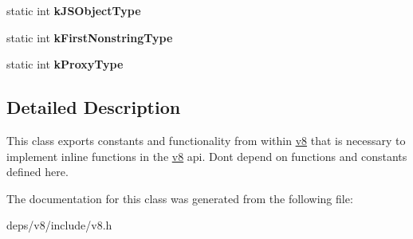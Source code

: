 \begin{DoxyCompactItemize}
\item 
\hypertarget{classv8_1_1internal_1_1_internals_a4b772318d4d1eb9f6097e18c086e4ae0}{}static int {\bfseries k\+J\+S\+Object\+Type}\label{classv8_1_1internal_1_1_internals_a4b772318d4d1eb9f6097e18c086e4ae0}

\item 
\hypertarget{classv8_1_1internal_1_1_internals_a4f9e9763f053dd20061c8a0f437116ba}{}static int {\bfseries k\+First\+Nonstring\+Type}\label{classv8_1_1internal_1_1_internals_a4f9e9763f053dd20061c8a0f437116ba}

\item 
\hypertarget{classv8_1_1internal_1_1_internals_aff06c0a3f16e74900f06a257a661cf7f}{}static int {\bfseries k\+Proxy\+Type}\label{classv8_1_1internal_1_1_internals_aff06c0a3f16e74900f06a257a661cf7f}

\end{DoxyCompactItemize}


\subsection{Detailed Description}
This class exports constants and functionality from within \hyperlink{namespacev8}{v8} that is necessary to implement inline functions in the \hyperlink{namespacev8}{v8} api. Don\textquotesingle{}t depend on functions and constants defined here. 

The documentation for this class was generated from the following file\+:\begin{DoxyCompactItemize}
\item 
deps/v8/include/v8.\+h\end{DoxyCompactItemize}
